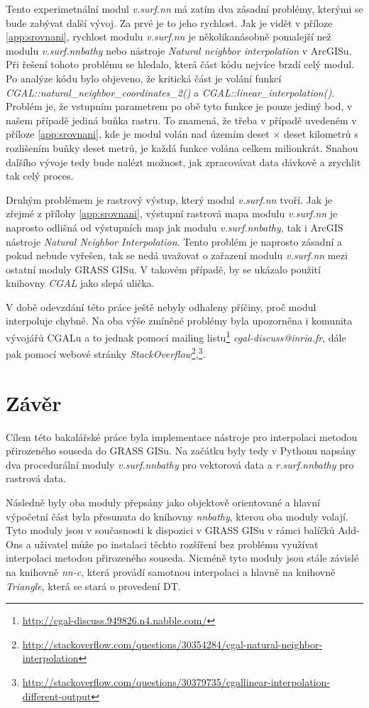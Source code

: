 \documentclass[12pt,a4paper]{article}
\newcommand{\necislovana}[1]{%
\phantomsection
\addcontentsline{toc}{section}{#1}



\section*{#1}
\markboth{\uppercase{#1}}{}
}
\begin{document}
Tento experimetnální modul \emph{v.surf.nn} má zatím dva zásadní problémy,
kterými se bude zabývat další vývoj. Za prvé je to jeho rychlost. 
Jak je vidět v příloze \ref{app:srovnani}, rychlost modulu \emph{v.surf.nn} je 
několikanásobně pomalejší než modulu \emph{v.surf.nnbathy} nebo nástroje 
\emph{Natural neighbor interpolation} v ArcGISu. Při řešení tohoto problému se hledalo, 
která část kódu nejvíce brzdí celý modul. Po analýze kódu bylo objeveno, 
že kritická část je volání funkcí \emph{CGAL::natural\_neighbor\_coordinates\_2()} a
 \emph{CGAL::linear\_interpolation()}. Problém je, že vstupním parametrem po obě tyto 
 funkce je pouze jediný bod, v našem případě jediná buňka rastru. To znamená, že 
třeba v případě uvedeném v příloze \ref{app:srovnani}, kde je modul volán nad územím 
deset $\times$ deset kilometrů s rozlišením buňky deset metrů, je každá funkce volána
celkem milionkrát. Snahou dalšího vývoje tedy bude nalézt možnost, jak zpracovávat 
data dávkově a zrychlit tak celý proces.

Druhým problémem je rastrový výstup, který modul \emph{v.surf.nn} tvoří. Jak je zřejmé 
z přílohy \ref{app:srovnani}, výstupní rastrová mapa modulu \emph{v.surf.nn} je naprosto 
odlišná od výstupních map jak modulu \emph{v.surf.nnbathy}, tak i ArcGIS nástroje 
\emph{Natural Neighbor Interpolation}. Tento problém je naprosto zásadní a pokud nebude vyřešen,
tak se nedá uvažovat o zařazení modulu \emph{v.surf.nn} mezi ostatní moduly GRASS GISu. 
V takovém případě, by se ukázalo použití knihovny \emph{CGAL} jako slepá ulička.

V době odevzdání této práce ještě nebyly odhaleny příčiny, proč modul interpoluje chybně.
Na oba výše zmíněné problémy byla upozorněna i komunita vývojářů CGALu a to jednak pomocí 
mailing listu\footnote{\url{http://cgal-discuss.949826.n4.nabble.com/}} \emph{cgal-discuss@inria.fr}, dále pak pomocí webové stránky
\emph{StackOverflow}\footnote{\url{http://stackoverflow.com/questions/30354284/cgal-natural-neighbor-interpolation}},\footnote{\url{http://stackoverflow.com/questions/30379735/cgallinear-interpolation-different-output}}.


\newpage
\necislovana{Závěr}

Cílem této bakalářské práce byla implementace nástroje pro interpolaci
metodou přirozeného souseda do GRASS GISu. Na začátku byly tedy v
Pythonu napsány dva procedurální moduly \emph{v.surf.nnbathy} pro vektorová data a
\emph{r.surf.nnbathy} pro rastrová data.

Následně byly oba moduly přepsány jako objektově orientované a 
hlavní výpočetní část byla přesunuta do knihovny \emph{nnbathy}, 
kterou oba moduly volají. Tyto moduly jsou v
současnosti k dispozici v GRASS GISu v rámci balíčků Add-Ons a
uživatel může po instalaci těchto rozšíření bez problému využívat
interpolaci metodou přirozeného souseda. Nicméně tyto moduly jsou
stále závislé na knihovně \emph{nn-c}, která provádí samotnou
interpolaci a hlavně na knihovně \emph{Triangle}, která se stará o
provedení DT.
\end{document}
